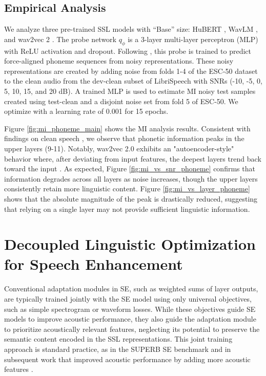 \documentclass{article}
\begin{document}
\subsection{Empirical Analysis}
\label{subsection:mi_setting}
We analyze three pre-trained SSL models with ``Base'' size: HuBERT \cite{hubert}, WavLM \cite{wavlm}, and wav2vec 2 \cite{wav2vec2}.
The probe network $q_\phi$ is a 3-layer multi-layer perceptron (MLP) with ReLU activation and dropout. Following \cite{mutual}, this probe is trained to predict force-aligned phoneme sequences \cite{forced_aligner} from noisy representations. These noisy representations are created by adding noise from folds 1-4 of the ESC-50 dataset \cite{esc50} to the clean audio from the dev-clean subset of LibriSpeech \cite{librispeech} with SNRs (-10, -5, 0, 5, 10, 15, and 20 dB). A trained MLP is used to estimate MI noisy test samples created using test-clean and a disjoint noise set from fold 5 of ESC-50. We optimize with a learning rate of 0.001 for 15 epochs.

Figure \ref{fig:mi_phoneme_main} shows the MI analysis results. Consistent with findings on clean speech \cite{layerwise_w2v, layerwise_all}, we observe that phonetic information peaks in the upper layers (9-11). 
Notably, wav2vec 2.0 exhibits an "autoencoder-style" behavior where, after deviating from input features, the deepest layers trend back toward the input \cite{layerwise_w2v}.
As expected, Figure \ref{fig:mi_vs_snr_phoneme} confirms that information degrades across all layers as noise increases, though the upper layers consistently retain more linguistic content. 
Figure \ref{fig:mi_vs_layer_phoneme} shows that the absolute magnitude of the peak is drastically reduced, suggesting that relying on a single layer may not provide sufficient linguistic information.


\section{Decoupled Linguistic Optimization for Speech Enhancement}
Conventional adaptation modules in SE, such as weighted sums of layer outputs, are typically trained jointly with the SE model using only universal objectives, such as simple spectrogram or waveform losses. While these objectives guide SE models to improve acoustic performance, they also guide the adaptation module to prioritize acoustically relevant features, neglecting its potential to preserve the semantic content encoded in the SSL representations. This joint training approach is standard practice, as in the SUPERB SE benchmark \cite{superb-sg, wsum_eval} and in subsequent work that improved acoustic performance by adding more acoustic features \cite{wsum_acoustic_se}.
\end{document}

